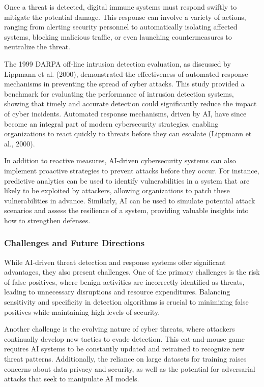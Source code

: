 \documentclass[12pt,twoside]{article}
\begin{document}
Once a threat is detected, digital immune systems must respond swiftly to mitigate the potential damage. This response can involve a variety of actions, ranging from alerting security personnel to automatically isolating affected systems, blocking malicious traffic, or even launching countermeasures to neutralize the threat.

The 1999 DARPA off-line intrusion detection evaluation, as discussed by Lippmann et al. (2000), demonstrated the effectiveness of automated response mechanisms in preventing the spread of cyber attacks. This study provided a benchmark for evaluating the performance of intrusion detection systems, showing that timely and accurate detection could significantly reduce the impact of cyber incidents. Automated response mechanisms, driven by AI, have since become an integral part of modern cybersecurity strategies, enabling organizations to react quickly to threats before they can escalate (Lippmann et al., 2000).

In addition to reactive measures, AI-driven cybersecurity systems can also implement proactive strategies to prevent attacks before they occur. For instance, predictive analytics can be used to identify vulnerabilities in a system that are likely to be exploited by attackers, allowing organizations to patch these vulnerabilities in advance. Similarly, AI can be used to simulate potential attack scenarios and assess the resilience of a system, providing valuable insights into how to strengthen defenses.

\subsubsection{Challenges and Future Directions}

While AI-driven threat detection and response systems offer significant advantages, they also present challenges. One of the primary challenges is the risk of false positives, where benign activities are incorrectly identified as threats, leading to unnecessary disruptions and resource expenditures. Balancing sensitivity and specificity in detection algorithms is crucial to minimizing false positives while maintaining high levels of security.

Another challenge is the evolving nature of cyber threats, where attackers continually develop new tactics to evade detection. This cat-and-mouse game requires AI systems to be constantly updated and retrained to recognize new threat patterns. Additionally, the reliance on large datasets for training raises concerns about data privacy and security, as well as the potential for adversarial attacks that seek to manipulate AI models.
\end{document}
